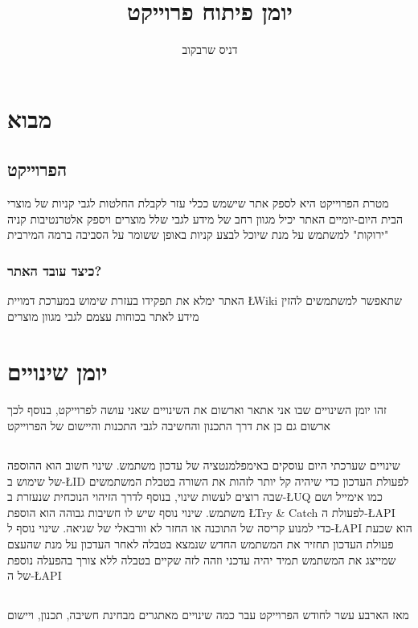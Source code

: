 \documentclass{report}
\title{יומן פיתוח פרוייקט}
\author{דניס שרבקוב}
\date{\displaydate{Initialcreation}}
\begin{document}
\maketitle

\tableofcontents

\newpage
\chapter{מבוא}
\section{הפרוייקט}
מטרת הפרוייקט היא לספק אתר שישמש ככלי עזר לקבלת החלטות לגבי קניות של מוצרי הבית היום-יומיים האתר יכיל מגוון רחב של מידע לגבי שלל מוצרים ויספק אלטרנטיבות קניה "ירוקות" למשתמש על מנת שיוכל לבצע קניות באופן ששומר על הסביבה ברמה המירבית
\subsection{כיצד עובד האתר?}
האתר ימלא את תפקידו בעזרת שימוש במערכת דמויית \L{Wiki} שתאפשר למשתמשים להזין מידע לאתר בכוחות עצמם לגבי מגוון מוצרים
\newpage

\chapter{יומן שינויים}
זהו יומן השינויים שבו אני אתאר וארשום את השינויים שאני עושה לפרוייקט, בנוסף לכך ארשום גם כן את דרך התכנון והחשיבה לגבי התכנות והיישום של הפרוייקט 

\section{\protect{}}

שינויים שערכתי היום עוסקים באימפלמנטציה של עדכון משתמש. שינוי חשוב הוא ההוספה של שימוש ב-\L{ID} לפעולת העדכון כדי שיהיה קל יותר לזהות את השורה בטבלת המשתמשים שבה רוצים לעשות שינוי, בנוסף לדרך הזיהוי הנוכחית שנעזרת ב-\L{UQ} כמו אימייל ושם משתמש. שינוי נוסף שיש לו חשיבות גבוהה הוא הוספת \L{Try \& Catch} לפעולת ה-\L{API} כדי למנוע קריסה של התוכנה או החזר לא וורבאלי של שגיאה. שינוי נוסף ל-\L{API} הוא שכעת פעולת העדכון תחזיר את המשתמש החדש שנמצא בטבלה לאחר העדכון על מנת שהעצם שמייצג את המשתמש תמיד יהיה עדכני וזהה לזה שקיים בטבלה ללא צורך בהפעלה נוספת של ה-\L{API}
\newpage
\section{\protect{}}
מאז הארבע עשר לחודש הפרוייקט עבר כמה שינויים מאתגרים מבחינת חשיבה, תכנון, ויישום
\end{document}

